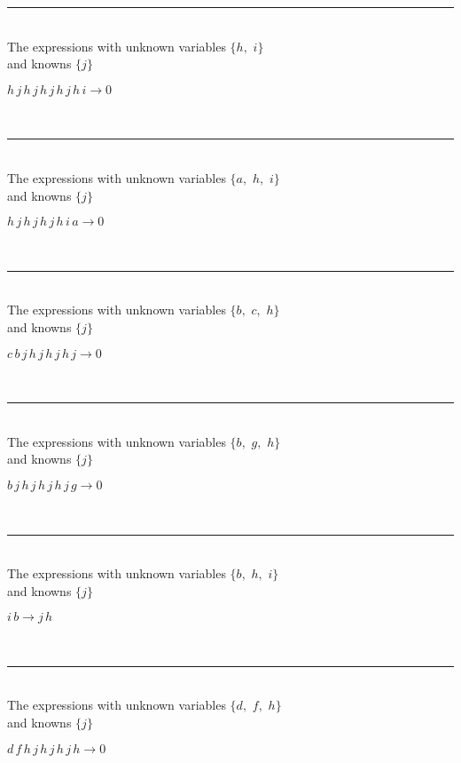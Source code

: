 \rule[3pt]{6in}{.7pt}\\
The expressions with unknown variables $\{h,
$ $
i\}$\\
and knowns $\{j\}$\smallskip\\
\begin{minipage}{6in}
$
h\,
 j\,
 h\,
 j\,
 h\,
 j\,
 h\,
 j\,
 h\,
 i\rightarrow 0
$
\end{minipage}\\
\rule[3pt]{6in}{.7pt}\\
The expressions with unknown variables $\{a,
$ $
h,
$ $
i\}$\\
and knowns $\{j\}$\smallskip\\
\begin{minipage}{6in}
$
h\,
 j\,
 h\,
 j\,
 h\,
 j\,
 h\,
 i\,
 a\rightarrow 0
$
\end{minipage}\\
\rule[3pt]{6in}{.7pt}\\
The expressions with unknown variables $\{b,
$ $
c,
$ $
h\}$\\
and knowns $\{j\}$\smallskip\\
\begin{minipage}{6in}
$
c\,
 b\,
 j\,
 h\,
 j\,
 h\,
 j\,
 h\,
 j\rightarrow 0
$
\end{minipage}\\
\rule[3pt]{6in}{.7pt}\\
The expressions with unknown variables $\{b,
$ $
g,
$ $
h\}$\\
and knowns $\{j\}$\smallskip\\
\begin{minipage}{6in}
$
b\,
 j\,
 h\,
 j\,
 h\,
 j\,
 h\,
 j\,
 g\rightarrow 0
$
\end{minipage}\\
\rule[3pt]{6in}{.7pt}\\
The expressions with unknown variables $\{b,
$ $
h,
$ $
i\}$\\
and knowns $\{j\}$\smallskip\\
\begin{minipage}{6in}
$
i\,
 b\rightarrow j\,
 h
$
\end{minipage}\\
\rule[3pt]{6in}{.7pt}\\
The expressions with unknown variables $\{d,
$ $
f,
$ $
h\}$\\
and knowns $\{j\}$\smallskip\\
\begin{minipage}{6in}
$
d\,
 f\,
 h\,
 j\,
 h\,
 j\,
 h\,
 j\,
 h\rightarrow 0
$
\end{minipage}\\
